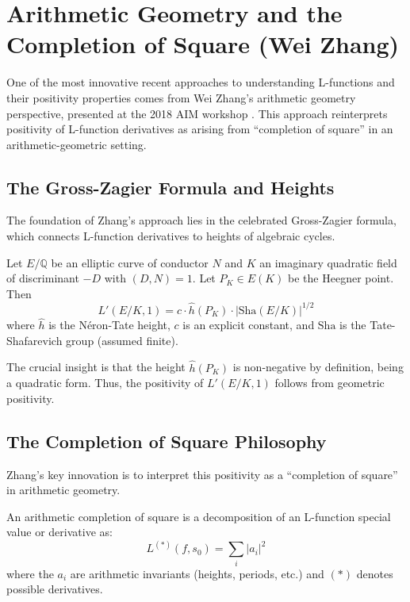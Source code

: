 \section{Arithmetic Geometry and the Completion of Square (Wei Zhang)}
\label{sec:wei_zhang}

One of the most innovative recent approaches to understanding L-functions and their positivity properties comes from Wei Zhang's arithmetic geometry perspective, presented at the 2018 AIM workshop \cite{zhang2018}. This approach reinterprets positivity of L-function derivatives as arising from ``completion of square'' in an arithmetic-geometric setting.

\subsection{The Gross-Zagier Formula and Heights}

The foundation of Zhang's approach lies in the celebrated Gross-Zagier formula, which connects L-function derivatives to heights of algebraic cycles.

\begin{theorem}
\label{thm:gross_zagier}
Let $E/\mathbb{Q}$ be an elliptic curve of conductor $N$ and $K$ an imaginary quadratic field of discriminant $-D$ with $(D,N) = 1$. Let $P_K \in E(K)$ be the Heegner point. Then
\begin{equation}
L'(E/K, 1) = c \cdot \hat{h}(P_K) \cdot |\text{Sha}(E/K)|^{1/2}
\end{equation}
where $\hat{h}$ is the Néron-Tate height, $c$ is an explicit constant, and $\text{Sha}$ is the Tate-Shafarevich group (assumed finite).
\end{theorem}

The crucial insight is that the height $\hat{h}(P_K)$ is non-negative by definition, being a quadratic form. Thus, the positivity of $L'(E/K, 1)$ follows from geometric positivity.

\subsection{The Completion of Square Philosophy}

Zhang's key innovation is to interpret this positivity as a ``completion of square'' in arithmetic geometry.

\begin{definition}
\label{def:arith_completion}
An arithmetic completion of square is a decomposition of an L-function special value or derivative as:
\begin{equation}
L^{(*)}(f, s_0) = \sum_{i} |a_i|^2
\end{equation}
where the $a_i$ are arithmetic invariants (heights, periods, etc.) and $(*)$ denotes possible derivatives.
\end{definition}


